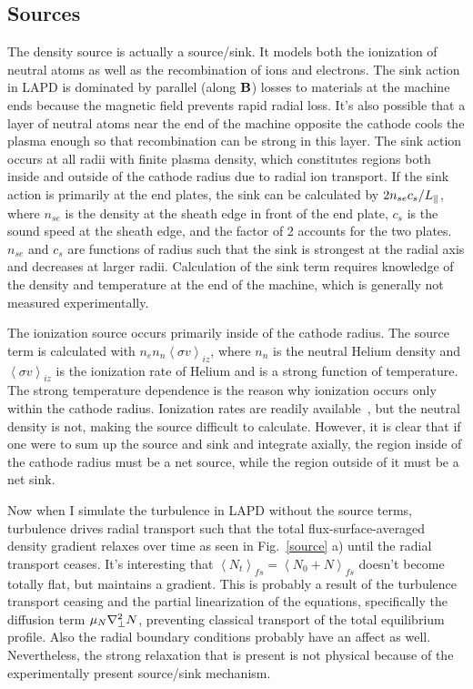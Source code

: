 \subsection{Sources}
\label{ss_sources}

The density source is actually a source/sink. It models both the ionization of neutral atoms as well as the recombination of ions and electrons. The sink action in LAPD
is dominated by parallel (along ${\bf B}$) losses to materials at the machine ends because the magnetic field prevents rapid radial loss. 
It's also possible that a layer of neutral atoms near the end of
the machine opposite the cathode cools the plasma enough so that recombination can be strong in this layer. The sink action occurs at all radii with finite plasma density, which constitutes regions
both inside and outside of the cathode radius due to radial ion transport. If the sink action is primarily at the end plates, the sink can be calculated by $2 n_{se} c_s/L_{\parallel}$, where
$n_{se}$ is the density at the sheath edge in front of the end plate, $c_s$ is the sound speed at the sheath edge, and the factor of 2 accounts for the two plates. $n_{se}$ and $c_s$ are functions
of radius such that the sink is strongest at the radial axis and decreases at larger radii. Calculation of the sink term requires knowledge of the density and temperature at the end of the machine,
which is generally not measured experimentally.

The ionization source occurs primarily inside of the cathode radius. The source term is calculated with $n_e n_n \left<\sigma v \right>_{iz}$, 
where $n_n$ is the neutral Helium density and $\left< \sigma v \right>_{iz}$
is the ionization rate of Helium and is a strong function of temperature. The strong temperature dependence is the reason why ionization occurs only within the cathode radius.
Ionization rates are readily available~\cite{stangeby2000}, but the neutral density is not, making the source difficult to calculate. However, it is clear that if one were to sum up
the source and sink and integrate axially, the region inside of the cathode radius must be a net source, while the region outside of it must be a net sink.

Now when I simulate the turbulence in LAPD without the source terms, turbulence drives radial transport such that the total flux-surface-averaged density gradient relaxes over time as seen
in Fig.~\ref{source} a) until the radial transport ceases. It's interesting that $\left< N_t \right>_{fs} = \left< N_0 + N \right>_{fs}$ doesn't become totally flat, but maintains a gradient. 
This is probably a result of the turbulence transport ceasing and the
partial linearization of the equations, specifically the diffusion term $\mu_N \nabla_\perp^2 N$, preventing classical transport of the total equilibrium profile. Also the radial boundary conditions
probably have an affect as well. Nevertheless, the strong relaxation that is present is not physical because of the experimentally present source/sink mechanism. 

